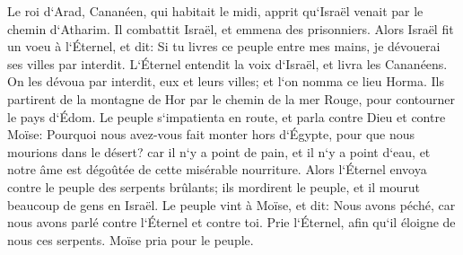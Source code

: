 \verse Le roi d`Arad, Cananéen, qui habitait le midi, apprit qu`Israël venait par le chemin d`Atharim. Il combattit Israël, et emmena des prisonniers. 
\verse Alors Israël fit un voeu à l`Éternel, et dit: Si tu livres ce peuple entre mes mains, je dévouerai ses villes par interdit. 
\verse L`Éternel entendit la voix d`Israël, et livra les Cananéens. On les dévoua par interdit, eux et leurs villes; et l`on nomma ce lieu Horma. 
\verse Ils partirent de la montagne de Hor par le chemin de la mer Rouge, pour contourner le pays d`Édom. Le peuple s`impatienta en route, 
\verse et parla contre Dieu et contre Moïse: Pourquoi nous avez-vous fait monter hors d`Égypte, pour que nous mourions dans le désert? car il n`y a point de pain, et il n`y a point d`eau, et notre âme est dégoûtée de cette misérable nourriture. 
\verse Alors l`Éternel envoya contre le peuple des serpents brûlants; ils mordirent le peuple, et il mourut beaucoup de gens en Israël. 
\verse Le peuple vint à Moïse, et dit: Nous avons péché, car nous avons parlé contre l`Éternel et contre toi. Prie l`Éternel, afin qu`il éloigne de nous ces serpents. Moïse pria pour le peuple. 
